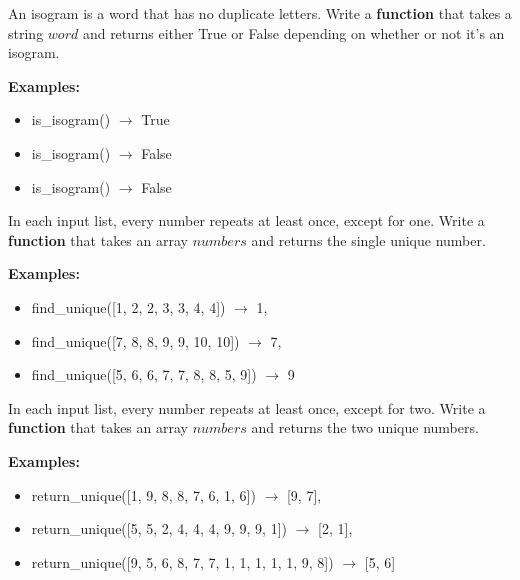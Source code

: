



	\item 	
		An isogram is a word that has no duplicate letters. Write a \textbf{function} that takes a string $word$ 
		and returns either True or False depending on whether or not it's an isogram.

		\textbf{Examples:}		
		\begin{itemize}
			\item  is\_isogram() $\rightarrow$ True
			\item  is\_isogram() $\rightarrow$ False
			\item  is\_isogram() $\rightarrow$ False
		\end{itemize}


	\item 	
		In each input list, every number repeats at least once, except for one. Write a \textbf{function} that takes an array $numbers$
		 and returns the single unique number.

		\textbf{Examples:}		
		\begin{itemize}
			\item  find\_unique([1, 2, 2, 3, 3, 4, 4]) $\rightarrow$ 1,
			\item  find\_unique([7, 8, 8, 9, 9, 10, 10]) $\rightarrow$ 7,
			\item  find\_unique([5, 6, 6, 7, 7, 8, 8, 5, 9]) $\rightarrow$ 9
		\end{itemize}



	\item 	
		In each input list, every number repeats at least once, except for two. Write a \textbf{function} that takes an array $numbers$
		 and returns the two unique numbers.

		\textbf{Examples:}		
		\begin{itemize}
			\item  return\_unique([1, 9, 8, 8, 7, 6, 1, 6]) $\rightarrow$ [9, 7],
			\item  return\_unique([5, 5, 2, 4, 4, 4, 9, 9, 9, 1]) $\rightarrow$ [2, 1],
			\item  return\_unique([9, 5, 6, 8, 7, 7, 1, 1, 1, 1, 1, 9, 8]) $\rightarrow$ [5, 6]
		\end{itemize}




